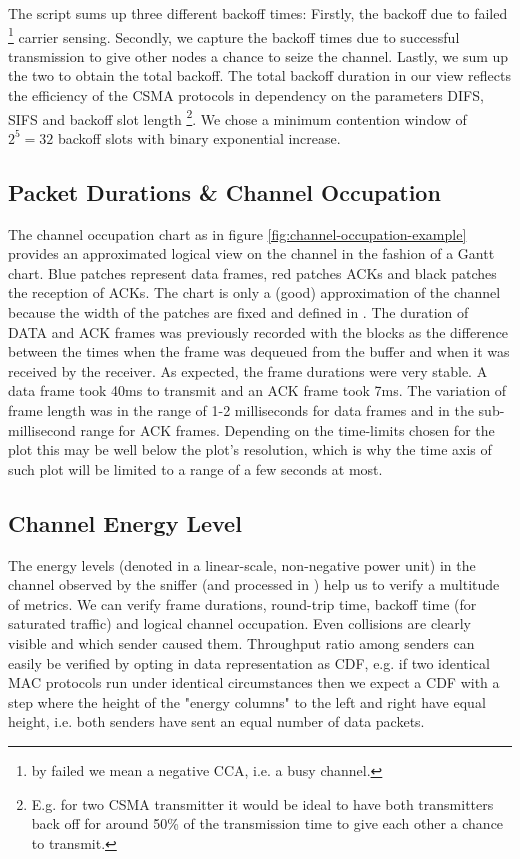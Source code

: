 The script  sums up three different backoff times: Firstly, the backoff due to failed \footnote{by failed we mean a negative CCA, i.e. a busy channel.} carrier sensing. Secondly, we capture the backoff times due to successful transmission to give other nodes a chance to seize the channel. Lastly, we sum up the two to obtain the total backoff. The total backoff duration in our view reflects the efficiency of the CSMA protocols in dependency on the parameters DIFS, SIFS and backoff slot length \footnote{E.g. for two CSMA transmitter it would be ideal to have both transmitters back off for around 50\% of the transmission time to give each other a chance to transmit.}. We chose a minimum contention window of $2^5=32$ backoff slots with binary exponential increase. 

\subsection{Packet Durations \& Channel Occupation}

The channel occupation chart as in figure \ref{fig:channel-occupation-example} provides an approximated logical view on the channel in the fashion of a Gantt chart. Blue patches represent data frames, red patches ACKs and black patches the reception of ACKs. The chart is only a (good) approximation of the channel because the width of the patches are fixed and defined in . The duration of DATA and ACK frames was previously recorded with the  blocks as the difference between the times when the frame was dequeued from the buffer and when it was received by the receiver. As expected, the frame durations were very stable. A data frame took 40ms to transmit and an ACK frame took 7ms. The variation of frame length was in the range of 1-2  milliseconds for data frames and in the sub-millisecond range for ACK frames. Depending on the time-limits chosen for the plot this may be well below the plot's resolution, which is why the time axis of such plot will be limited to a range of a few seconds at most.

\subsection{Channel Energy Level}

The energy levels (denoted in a linear-scale, non-negative power unit) in the channel observed by the sniffer (and processed in ) help us to verify a multitude of metrics. We can verify frame durations, round-trip time, backoff time (for saturated traffic) and logical channel occupation. Even collisions are clearly visible and which sender caused them. Throughput ratio among senders can easily be verified by opting in data representation as CDF, e.g. if two identical MAC protocols run under identical circumstances then we expect a CDF with a step where the height of the "energy columns" to the left and right have equal height, i.e. both senders have sent an equal number of data packets.

